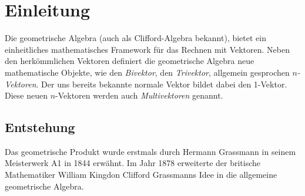 %
%
%
%
\section{Einleitung\label{geoalgebra:section:einfuehrung}}
Die geometrische Algebra (auch als Clifford-Algebra bekannt), bietet ein einheitliches mathematisches
Framework für das Rechnen mit Vektoren.
Neben den herkömmlichen Vektoren definiert die geometrische
Algebra neue mathematische Objekte, wie den \emph{Bivektor}, den \emph{Trivektor}, allgemein gesprochen
\emph{$n$-Vektoren}.
Der uns bereits bekannte normale Vektor bildet dabei den 1-Vektor. Diese neuen $n$-Vektoren werden auch
\emph{Multivektoren} genannt.

\subsection{Entstehung}
Das geometrische Produkt wurde erstmals durch Hermann Grassmann in seinem Meisterwerk \glqq{}A1\grqq{} in 1844
erwähnt. Im Jahr 1878 erweiterte der britische Mathematiker William Kingdon Clifford Grassmanns Idee
in die allgemeine geometrische Algebra. 


